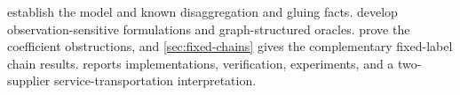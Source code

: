  establish the model and known disaggregation
and gluing facts. 
develop observation-sensitive formulations and graph-structured oracles.
 prove the coefficient obstructions,
and \cref{sec:fixed-chains} gives the complementary fixed-label chain results.
 reports implementations, verification, experiments,
and a two-supplier service-transportation interpretation.
